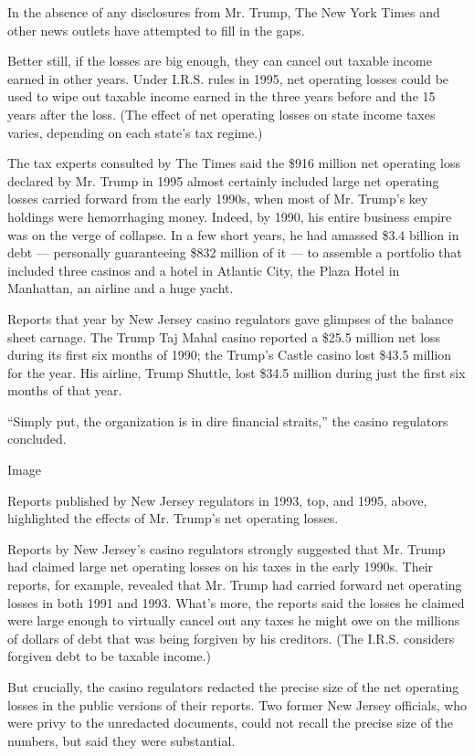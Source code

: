 In the absence of any disclosures from Mr. Trump, The New York Times and
other news outlets have attempted to fill in the gaps.

Better still, if the losses are big enough, they can cancel out taxable
income earned in other years. Under I.R.S. rules in 1995, net operating
losses could be used to wipe out taxable income earned in the three
years before and the 15 years after the loss. (The effect of net
operating losses on state income taxes varies, depending on each state's
tax regime.)

The tax experts consulted by The Times said the \$916 million net
operating loss declared by Mr. Trump in 1995 almost certainly included
large net operating losses carried forward from the early 1990s, when
most of Mr. Trump's key holdings were hemorrhaging money. Indeed, by
1990, his entire business empire was on the verge of collapse. In a few
short years, he had amassed \$3.4 billion in debt --- personally
guaranteeing \$832 million of it --- to assemble a portfolio that
included three casinos and a hotel in Atlantic City, the Plaza Hotel in
Manhattan, an airline and a huge yacht.

Reports that year by New Jersey casino regulators gave glimpses of the
balance sheet carnage. The Trump Taj Mahal casino reported a \$25.5
million net loss during its first six months of 1990; the Trump's Castle
casino lost \$43.5 million for the year. His airline, Trump Shuttle,
lost \$34.5 million during just the first six months of that year.

``Simply put, the organization is in dire financial straits,'' the
casino regulators concluded.

Image

Reports published by New Jersey regulators in 1993, top, and 1995,
above, highlighted the effects of Mr. Trump's net operating losses.

Reports by New Jersey's casino regulators strongly suggested that Mr.
Trump had claimed large net operating losses on his taxes in the early
1990s. Their reports, for example, revealed that Mr. Trump had carried
forward net operating losses in both 1991 and 1993. What's more, the
reports said the losses he claimed were large enough to virtually cancel
out any taxes he might owe on the millions of dollars of debt that was
being forgiven by his creditors. (The I.R.S. considers forgiven debt to
be taxable income.)

But crucially, the casino regulators redacted the precise size of the
net operating losses in the public versions of their reports. Two former
New Jersey officials, who were privy to the unredacted documents, could
not recall the precise size of the numbers, but said they were
substantial.

